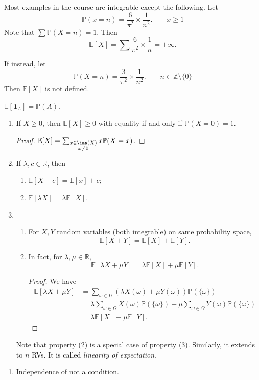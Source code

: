 \begin{example}
    Most examples in the course are integrable except the following. Let
    \[
        \mathbb{P}(x = n) = \frac{6}{\pi^2} \times \frac{1}{n^2}. \qquad x \geq 1
    \]
    Note that \(\sum \mathbb{P}(X = n) = 1\). Then
    \[
        \mathbb{E}[X] = \sum \frac{6}{\pi^2} \times\frac{1}{n} = + \infty.
    \]

    If instead, let
    \[
        \mathbb{P}(X = n) = \frac{3}{\pi^2} \times\frac{1}{n^2}.\qquad n \in \mathbb{Z}\setminus \{0\}
    \]
    Then \(\mathbb{E}[X]\) is not defined.
\end{example}
\begin{example}
    \(\mathbb{E}[\mathbf{1}_A] = \mathbb{P}(A)\).
\end{example}
\begin{property}
\begin{enumerate}
    \item If \(X \geq 0\), then \(\mathbb{E}[X] \geq 0\) with equality if and only if \(\mathbb{P}(X = 0) = 1\).
    \begin{proof}
        \(\mathbb{E}[X] = \sum_{\substack{x \in \ima(X)\\ x\neq 0}} x \mathbb{P}(X = x)\).
    \end{proof}
    \item If \(\lambda, c \in \mathbb{R}\), then
    \begin{enumerate}
        \item \(\mathbb{E}[X + c] = \mathbb{E}[x] + c\);
        \item \(\mathbb{E}[\lambda X] = \lambda\mathbb{E}[X]\).
    \end{enumerate}
    \item \begin{enumerate}
        \item For \(X, Y\) random variables (both integrable) on same probability space,
        \[
            \mathbb{E}[X + Y] = \mathbb{E}[X] + \mathbb{E}[Y].
        \]
        \item In fact, for \(\lambda, \mu \in \mathbb{R}\),
        \[
            \mathbb{E}[\lambda X + \mu Y] = \lambda \mathbb{E}[X] + \mu\mathbb{E}[Y].
        \]
        \begin{proof}
            We have
            \begin{align*}
                \mathbb{E}[\lambda X + \mu Y] &= \sum_{\omega\in \Omega} (\lambda X(\omega) + \mu Y(\omega))\mathbb{P}(\{\omega\})\\
                &= \lambda \sum_{\omega\in\Omega} X(\omega)\mathbb{P}(\{\omega\}) + \mu\sum_{\omega\in\Omega} Y(\omega)\mathbb{P}(\{\omega\})\\
                &= \lambda \mathbb{E}[X] + \mu\mathbb{E}[Y].
            \end{align*}
        \end{proof}
    \end{enumerate}
    Note that property (2) is a special case of property (3). Similarly, it extends to \(n\) RVs. It is called \textit{linearity of expectation}.
\end{enumerate}
\end{property}
\begin{remark}
    \begin{enumerate}
        \item Independence of not a condition.
    \end{enumerate}
\end{remark}